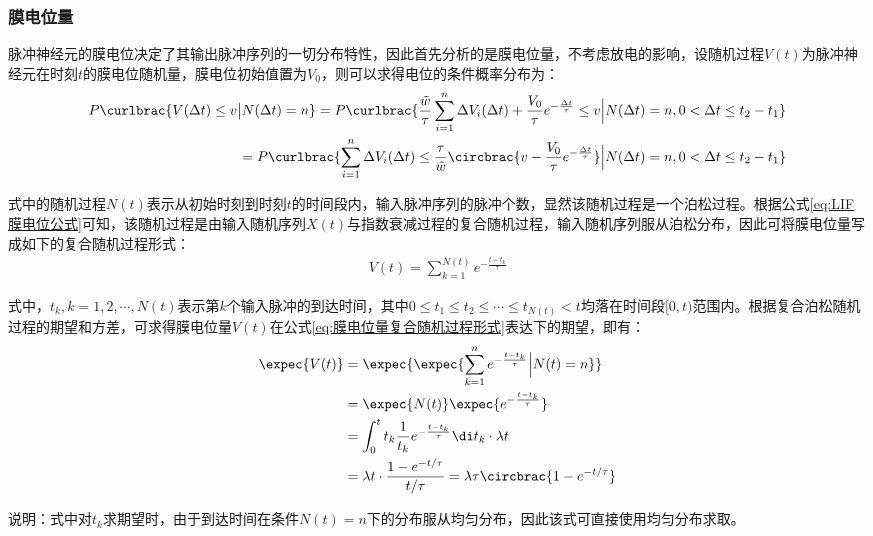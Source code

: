 \documentclass[11pt]{article}
\begin{document}
\subsubsection{膜电位量}
脉冲神经元的膜电位决定了其输出脉冲序列的一切分布特性，因此首先分析的是膜电位量，不考虑放电的影响，设随机过程$V(t)$为脉冲神经元在时刻$t$的膜电位随机量，膜电位初始值置为$V_0$，则可以求得电位的条件概率分布为：
\begin{align}
  \begin{aligned}
    P\curlbrac{V(\Delta t)\le v
    \big|  N(\Delta t)=n}  =P\curlbrac{\frac{\tilde{w}}{\tau}\sum_{i=1}^{n}\Delta V_i(\Delta t)+\frac{V_0}{\tau}e^{-\frac{\Delta t}{\tau}}\le v\Big| N(\Delta t)=n,0<\Delta t\le t_2-t_1}            \\
                    =P\curlbrac{\sum_{i=1}^{n}\Delta V_i(\Delta t)\le \frac{\tau}{\tilde{w}}\circbrac{v-\frac{V_0}{\tau}e^{-\frac{\Delta t}{\tau}}}\Big| N(\Delta t)=n,0<\Delta t\le t_2-t_1}
  \end{aligned} \label{eq:膜电位的条件分布概率}
\end{align}\par
式中的随机过程$N(t)$表示从初始时刻到时刻$t$的时间段内，输入脉冲序列的脉冲个数，显然该随机过程是一个泊松过程。根据公式\ref{eq:LIF膜电位公式}可知，该随机过程是由输入随机序列$X(t)$与指数衰减过程的复合随机过程，输入随机序列服从泊松分布，因此可将膜电位量写成如下的复合随机过程形式：
\begin{align}
  V(t)=\sum_{k=1}^{N(t)}e^{-\frac{t-t_k}{\tau}}
  \label{eq:膜电位量复合随机过程形式}
\end{align}\par
式中，$t_k,k=1,2,\cdots,N(t)$表示第$k$个输入脉冲的到达时间，其中$0\le t_1\le t_2\le\cdots\le t_{N(t)}<t$均落在时间段$[0,t)$范围内。根据复合泊松随机过程的期望和方差，可求得膜电位量$V(t)$在公式\ref{eq:膜电位量复合随机过程形式}表达下的期望，即有：
\begin{align}
  \begin{aligned}
  \expec{V(t)}&=\expec{\expec{\sum_{k=1}^{n}e^{-\frac{t-t_k}{\tau}}\Big|N(t)=n}}\\
  &=\expec{N(t)}\expec{e^{-\frac{t-t_k}{\tau}}}\\
  &=\int_{0}^{t}t_k\frac{1}{t_k}e^{-\frac{t-t_k}{\tau}}\di t_k\cdot \lambda t\\
  &=\lambda t\cdot\frac{1-e^{- t/\tau}}{ t/\tau}=\lambda\tau\circbrac{1-e^{- t/\tau}}
\end{aligned} \label{eq:膜电位量的期望}
\end{align}\par
说明：式中对$t_k$求期望时，由于到达时间在条件$N(t)=n$下的分布服从均匀分布，因此该式可直接使用均匀分布求取。
\end{document}
